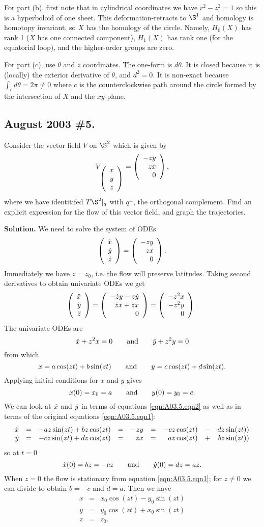 \documentclass[10pt]{article}
\numberwithin{equation}{subsection}
\begin{document}
For part (b), first note that in cylindrical coordinates we have $r^2-z^2=1$ so
this is a hyperboloid of one sheet.  This deformation-retracts to $\S^1$ and
homology is homotopy invariant, so $X$ has the homology of the circle.  Namely,
$H_0(X)$ has rank 1 ($X$ has one connected component), $H_1(X)$ has rank one
(for the equatorial loop), and the higher-order groups are zero.

For part (c), use $\theta$ and $z$ coordinates.  The one-form is $d\theta$.
It is closed because it is (locally) the exterior derivative of $\theta$,
and $d^2 = 0$.  It is non-exact because $\int_c d\theta = 2\pi\ne 0$ where
$c$ is the counterclockwise path around the circle formed by the intersection
of $X$ and the $xy$-plane.

\subsection{August 2003 \#5.}
\label{sec:A03.5}

Consider the vector field $V$ on $\S^2$ which is given by
\begin{equation}
\label{eqn:A03.5.eqn1}
	V_{\colvecthree{x}{y}{z}} = \colrvecthree{-zy}{zx}{0},
\end{equation}
where we have identitifed $T\S^2|_q$ with $q^\perp$, the orthogonal complement.
Find an explicit expression for the flow of this vector field, and graph the
trajectories.

\textbf{Solution.}  We need to solve the system of ODEs
$$
	\colvecthree{\xdot}{\ydot}{\zdot} = \colrvecthree{-zy}{zx}{0}.
$$
Immediately we have $z=z_0$, i.e. the flow will preserve latitudes.
Taking second derivatives to obtain univariate ODEs we get
$$
	\colvecthree{\xddot}{\yddot}{\zddot}
	= \colrvecthree{-\zdot y - z\ydot}{\zdot x + z \xdot}{0}
	= \colrvecthree{-z^2x}{-z^2y}{0}.
$$
The univariate ODEs are
$$
	\xddot + z^2 x = 0 \qqand \yddot + z^2 y = 0
$$
from which
\begin{equation}
\label{eqn:A03.5.eqn2}
	x = a \cos(zt) + b \sin(zt) \qqand
	y = c \cos(zt) + d \sin(zt).
\end{equation}
Applying initial conditions for $x$ and $y$ gives
$$
	x(0) = x_0 = a \qqand
	y(0) = y_0 = c.
$$
We can look at $\xdot$ and $\ydot$ in terms of equations
\ref{eqn:A03.5.eqn2} as well as in terms of the original equations
\ref{eqn:A03.5.eqn1}:
$$
	\usamatrix{rrrrrrrrr}{
\xdot &=&-az \sin(zt) + bz \cos(zt) &=& -zy &=& -cz \cos(zt) &-& dz \sin(zt)) \\
\ydot &=&-cz \sin(zt) + dz \cos(zt) &=&  zx &=&  az \cos(zt) &+& bz \sin(zt))
	}
$$
so at $t=0$
$$
	\xdot(0) = bz = -cz \qqand
	\ydot(0) = dz =  az.
$$
When $z = 0$ the flow is stationary from equation \ref{eqn:A03.5.eqn1};
for $z\ne 0$ we can divide to obtain $b=-c$ and $d=a$.  Then we have
\begin{eqnarray*}
	x &=& x_0 \cos(zt) - y_0 \sin(zt) \\
	y &=& y_0 \cos(zt) + x_0 \sin(zt) \\
	z &=& z_0.
\end{eqnarray*}
\end{document}
